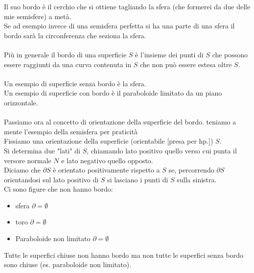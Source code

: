 \documentclass[a4paper, oneside]{article}
\begin{document}
Il suo bordo è il cerchio che si ottiene tagliando la sfera (che formerei da due delle mie semisfere) a metà.\\
Se ad esempio invece di una semisfera perfetta si ha una parte di una sfera il bordo sarà la circonferenza che seziona la sfera.\\
\hfill\\
Più in generale il bordo di una superficie $S$ è l'insieme dei punti di $S$ che 
possono essere raggiunti da una curva contenuta in $S$ che non può essere 
estesa oltre $S$.\\
\hfill\\
Un esempio di superficie senza bordo è la sfera.\\
Un esempio di superficie con bordo è il paraboloide limitato da un piano orizzontale.
\hfill\\ 
\hfill\\ 
Passiamo ora al concetto di orientazione della superficie del bordo. teniamo a mente l'esempio della semisfera per praticità\\
Fissiamo una orientazione della superficie (orientabile [presa per hp.]) $S$.\\
Si determina due "lati" di $S$, chiamando lato positivo quello verso cui punta il versore normale $N$ e lato negativo quello opposto.\\
Diciamo che $\partial S$ è orientato positivamente rispetto a $S$ se, percorrendo $\partial S$ orientandosi sul lato positivo di $S$ si lasciano i punti di $S$ sulla sinistra.\\
Ci sono figure che non hanno bordo:
\begin{itemize}
  \item sfera $\partial = \emptyset$
  \item toro $\partial = \emptyset$
  \item Paraboloide non limitato $\partial = \emptyset$
\end{itemize}
Tutte le superfici chiuse non hanno bordo ma non tutte le superfici senza bordo sono chiuse (es. paraboloide non limitato).
\end{document}
